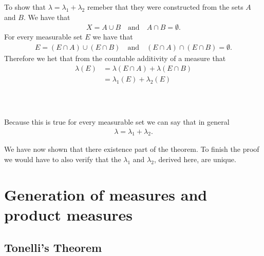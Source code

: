 \documentclass{beamer}
\numberwithin{equation}{section}
\begin{document}
\begin{frame}\frametitle{{\normalsize \secname} \\ {\large \subsecname}}
    To show that $\lambda = \lambda_1 + \lambda_2$ remeber that they were constructed from the sets $A$ and $B$.
    We have that
    \begin{align}
        X = A \cup B \quad \text{and} \quad A \cap B = \emptyset.
    \end{align}
    For every measurable set $E$ we have that
    \begin{align}
        E = (E \cap A) \cup (E \cap B) \quad \text{and} \quad (E \cap A) \cap (E \cap B) = \emptyset.
    \end{align}
    Therefore we het that from the countable additivity of a measure that
    \begin{align}
        \lambda(E) &= \lambda(E \cap A) + \lambda(E \cap B) \\
        &= \lambda_1(E) + \lambda_2(E)
    \end{align}
\end{frame}

\begin{frame}\frametitle{{\normalsize \secname} \\ {\large \subsecname}}
    Because this is true for every measurable set we can say that in general
    \begin{align}
        \lambda = \lambda_1 + \lambda_2.
    \end{align}
    \vspace{1em}

    We have now shown that there existence part of the theorem.
    To finish the proof we would have to also verify that the $\lambda_1$ and $\lambda_2$, derived here, are unique.
\end{frame}

\section{Generation of measures and product measures}

\subsection{Tonelli's Theorem}
\end{document}
